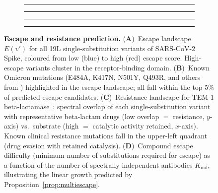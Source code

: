 \documentclass[twocolumn,11pt,a4paper]{article}
\theoremstyle{definition}
\theoremstyle{remark}
\begin{document}
\begin{figure}[t]
\centering
\begin{subfigure}[b]{0.23\textwidth}
  \rule{\textwidth}{0.6\textwidth}
  \caption{}
  \label{fig:esc_landscape}
\end{subfigure}
\hfill
\begin{subfigure}[b]{0.23\textwidth}
  \rule{\textwidth}{0.6\textwidth}
  \caption{}
  \label{fig:esc_omicron}
\end{subfigure}
\hfill
\begin{subfigure}[b]{0.23\textwidth}
  \rule{\textwidth}{0.6\textwidth}
  \caption{}
  \label{fig:esc_resist}
\end{subfigure}
\hfill
\begin{subfigure}[b]{0.23\textwidth}
  \rule{\textwidth}{0.6\textwidth}
  \caption{}
  \label{fig:esc_compound}
\end{subfigure}
\caption{\textbf{Escape and resistance prediction.}
(\textbf{A})~Escape landscape $E(v')$ for all 19L single-substitution variants
of SARS-CoV-2 Spike, coloured from low (blue) to high (red) escape score.
High-escape variants cluster in the receptor-binding domain.
(\textbf{B})~Known Omicron mutations (E484A, K417N, N501Y, Q493R, and others
from \citet{cameroni2022}) highlighted in the escape landscape; all fall within
the top 5\% of predicted escape candidates.
(\textbf{C})~Resistance landscape for TEM-1 beta-lactamase~\citep{bush2010}:
spectral overlap of each single-substitution variant with representative
beta-lactam drugs (low overlap $=$ resistance, $y$-axis) vs.\ substrate (high
$=$ catalytic activity retained, $x$-axis). Known clinical resistance mutations
fall in the upper-left quadrant (drug evasion with retained catalysis).
(\textbf{D})~Compound escape difficulty (minimum number of substitutions
required for escape) as a function of the number of spectrally independent
antibodies $K_{\text{ind}}$, illustrating the linear growth predicted by
Proposition~\ref{prop:multiescape}.}
\label{fig:escape}
\end{figure}
\end{document}
